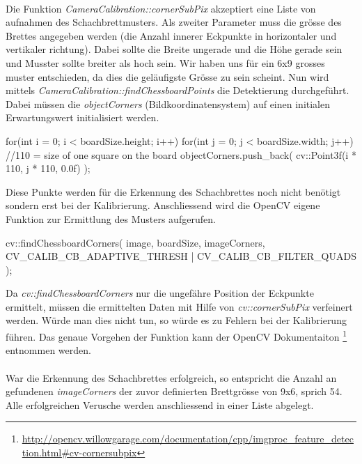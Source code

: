 \documentclass[main.tex]{subfiles}
\begin{document}
\paragraph{}
Die Funktion \textit{CameraCalibration::cornerSubPix} akzeptiert eine Liste von aufnahmen des Schachbrettmusters. Als zweiter Parameter muss die grösse des Brettes angegeben werden (die Anzahl innerer Eckpunkte in horizontaler und vertikaler richtung). Dabei sollte die Breite ungerade und die Höhe gerade sein und Musster sollte breiter als hoch sein. Wir haben uns für ein 6x9 grosses muster entschieden, da dies die geläufigste Grösse zu sein scheint. Nun wird mittels \textit{CameraCalibration::findChessboardPoints} die Detektierung durchgeführt. Dabei müssen die \textit{objectCorners} (Bildkoordinatensystem) auf einen initialen Erwartungswert initialisiert werden.

\begin{c++code}
for(int i = 0; i < boardSize.height; i++)
{
    for(int j = 0; j < boardSize.width; j++)
    {
		//110 = size of one square on the board
        objectCorners.push_back(
			cv::Point3f(i * 110, j * 110, 0.0f)
		);
    }
}
\end{c++code}

Diese Punkte werden für die Erkennung des Schachbrettes noch nicht benötigt sondern erst bei der Kalibrierung. Anschliessend wird die OpenCV eigene Funktion zur Ermittlung des Musters aufgerufen.

\begin{c++code}
cv::findChessboardCorners(
	image, 
	boardSize, 
	imageCorners, 
	CV_CALIB_CB_ADAPTIVE_THRESH | CV_CALIB_CB_FILTER_QUADS
);
\end{c++code}

Da \textit{cv::findChessboardCorners} nur die ungefähre Position der Eckpunkte ermittelt, müssen die ermittelten Daten mit Hilfe von \textit{cv::cornerSubPix} verfeinert werden. Würde man dies nicht tun, so würde es zu Fehlern bei der Kalibrierung führen. Das genaue Vorgehen der Funktion kann der OpenCV Dokumentaiton \footnote{\url{http://opencv.willowgarage.com/documentation/cpp/imgproc\_feature\_detection.html\#cv-cornersubpix}} entnommen werden.

\paragraph{}War die Erkennung des Schachbrettes erfolgreich, so entspricht die Anzahl an gefundenen \textit{imageCorners} der zuvor definierten Brettgrösse von 9x6, sprich 54. Alle erfolgreichen Verusche werden anschliessend in einer Liste abgelegt. 
\end{document}
